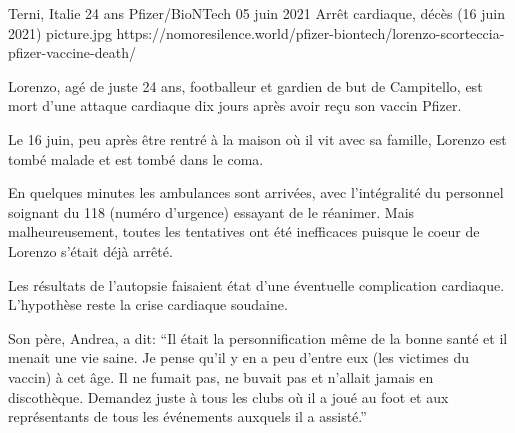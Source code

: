           {Terni, Italie}
          {24 ans}
          {Pfizer/BioNTech}
          {05 juin 2021}
          {
            Arrêt cardiaque,
            décès (16 juin 2021)
          }
          {picture.jpg}
          {https://nomoresilence.world/pfizer-biontech/lorenzo-scorteccia-pfizer-vaccine-death/}
          {

Lorenzo, agé de juste 24 ans, footballeur et gardien de but de Campitello, est
mort d'une attaque cardiaque dix jours après avoir reçu son vaccin Pfizer.

Le 16 juin, peu après être rentré à la maison où il vit avec sa famille, Lorenzo
est tombé malade et est tombé dans le coma.

En quelques minutes les ambulances sont arrivées, avec l'intégralité du
personnel soignant du 118 (numéro d'urgence) essayant de le réanimer. Mais
malheureusement, toutes les tentatives ont été inefficaces puisque le coeur de
Lorenzo s'était déjà arrêté.

Les résultats de l'autopsie faisaient état d'une éventuelle complication
cardiaque. L'hypothèse reste la crise cardiaque soudaine.

Son père, Andrea, a dit: “Il était la personnification même de la bonne santé et
il menait une vie saine. Je pense qu'il y en a peu d'entre eux (les victimes du
vaccin) à cet âge. Il ne fumait pas, ne buvait pas et n'allait jamais en
discothèque. Demandez juste à tous les clubs où il a joué au foot et aux
représentants de tous les événements auxquels il a assisté.”

}

